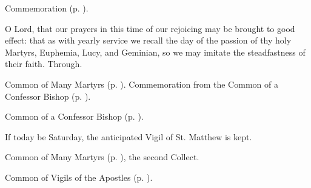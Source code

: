 \begin{rubric}
    Commemoration  (p. \pageref{EuphemiaCollect}).
\end{rubric}



\memorialCollect\label{EuphemiaCollect}
 O Lord, that our prayers in this time of our rejoicing may be brought to good effect: that as with yearly service we recall the day of the passion of thy holy Martyrs, Euphemia, Lucy, and Geminian, so we may imitate the steadfastness of their faith. Through.



\begin{rubric}
	Common of Many Martyrs (p. \pageref{CommonMartyrs}). Commemoration  from the Common of a Confessor Bishop (p. \pageref{ConfessorBishopCollect}).
\end{rubric}



\begin{rubric}
	Common of a Confessor Bishop (p. \pageref{ConfessorBishopCollect}).
\end{rubric}

\begin{rubric}
	If today be Saturday, the anticipated Vigil of St. Matthew is kept.
\end{rubric}



\begin{rubric}
	Common of Many Martyrs (p. \pageref{CommonMartyrsNotBishopsCollect}), the second Collect.
\end{rubric}



\begin{rubric}
	Common of Vigils of the Apostles (p. \pageref{CommonVigilApostles}).
\end{rubric}


